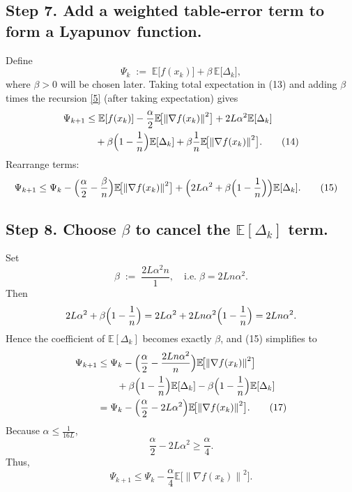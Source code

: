 \documentclass{article}
\newcommand{\EE}{\mathbb{E}}
\newcommand{\norm}[1]{\left\|#1\right\|}
\begin{document}
\subsection*{Step 7. Add a weighted table‑error term to form a Lyapunov function.}
Define
\[
\Psi_k \;:=\; \EE\!\bigl[f(x_k)\bigr]+\beta\,\EE\!\bigl[\Delta_k\bigr],
\]
where $\beta>0$ will be chosen later.
Taking total expectation in (13) and adding $\beta$ times the recursion
\eqref{5} (after taking expectation) gives
\begin{align}
\Psi_{k+1}
 &\le \EE[f(x_k)]-\frac{\alpha}{2}\EE\!\bigl[\norm{\nabla f(x_k)}^{2}\bigr]
      +2L\alpha^{2}\EE[\Delta_k]                     \nonumber\\
 &\quad +\beta\Bigl(1-\frac{1}{n}\Bigr)\EE[\Delta_k]
      +\beta\frac{1}{n}\EE\!\bigl[\norm{\nabla f(x_k)}^{2}\bigr].
 \tag{14}
\end{align}
Rearrange terms:
\begin{align}
\Psi_{k+1}
 &\le \Psi_k
   -\Bigl(\frac{\alpha}{2}-\frac{\beta}{n}\Bigr)
      \EE\!\bigl[\norm{\nabla f(x_k)}^{2}\bigr]
   +\Bigl(2L\alpha^{2}+\beta\Bigl(1-\frac{1}{n}\Bigr)\Bigr)
      \EE[\Delta_k].
 \tag{15}
\end{align}

\subsection*{Step 8. Choose $\beta$ to cancel the $\EE[\Delta_k]$ term.}
Set
\[
\beta \;:=\; \frac{2L\alpha^{2} n}{1},
\quad\text{i.e.}\;\beta = 2Ln\alpha^{2}.
\tag{16}
\]
Then
\[
2L\alpha^{2}+\beta\Bigl(1-\frac{1}{n}\Bigr)
 =2L\alpha^{2}+2Ln\alpha^{2}\Bigl(1-\frac{1}{n}\Bigr)
 =2Ln\alpha^{2}.
\]
Hence the coefficient of $\EE[\Delta_k]$ becomes exactly $\beta$,
and (15) simplifies to
\begin{align}
\Psi_{k+1}
 &\le \Psi_k
   -\Bigl(\frac{\alpha}{2}-\frac{2Ln\alpha^{2}}{n}\Bigr)
      \EE\!\bigl[\norm{\nabla f(x_k)}^{2}\bigr]      \nonumber\\
 &\qquad
   +\beta\Bigl(1-\frac{1}{n}\Bigr)\EE[\Delta_k]-
      \beta\Bigl(1-\frac{1}{n}\Bigr)\EE[\Delta_k]   \nonumber\\
 &=
   \Psi_k -\Bigl(\frac{\alpha}{2}-2L\alpha^{2}\Bigr)
      \EE\!\bigl[\norm{\nabla f(x_k)}^{2}\bigr].
 \tag{17}
\end{align}
Because $\alpha\le \frac{1}{16L}$,
\[
\frac{\alpha}{2}-2L\alpha^{2}
   \ge \frac{\alpha}{4}.
\]
Thus,
\[
\Psi_{k+1}\le \Psi_k-\frac{\alpha}{4}
                \EE\!\bigl[\norm{\nabla f(x_k)}^{2}\bigr].
\tag{18}
\]
\end{document}
